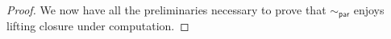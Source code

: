 \begin{proof}
%
%
We now have all the preliminaries necessary to prove that $\sim_\mathsf{par}$ enjoys lifting closure under computation.



\end{proof}
